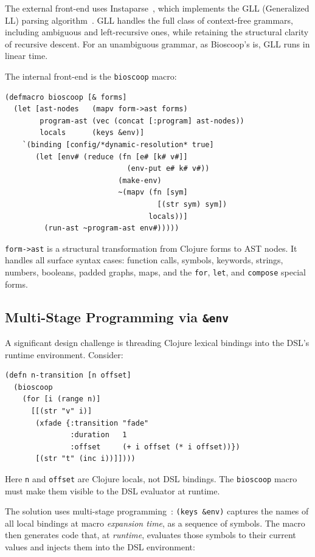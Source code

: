 \documentclass[conference]{IEEEtran}
\begin{document}
The external front-end uses Instaparse~\cite{instaparse}, which implements the GLL (Generalized LL) parsing algorithm~\cite{gll}. GLL handles the full class of context-free grammars, including ambiguous and left-recursive ones, while retaining the structural clarity of recursive descent. For an unambiguous grammar, as Bioscoop's is, GLL runs in linear time.

The internal front-end is the \texttt{bioscoop} macro:

\begin{lstlisting}[caption={The bioscoop macro}]
(defmacro bioscoop [& forms]
  (let [ast-nodes   (mapv form->ast forms)
        program-ast (vec (concat [:program] ast-nodes))
        locals      (keys &env)]
    `(binding [config/*dynamic-resolution* true]
       (let [env# (reduce (fn [e# [k# v#]]
                            (env-put e# k# v#))
                          (make-env)
                          ~(mapv (fn [sym]
                                   [(str sym) sym])
                                 locals))]
         (run-ast ~program-ast env#)))))
\end{lstlisting}

\texttt{form->ast} is a structural transformation from Clojure forms to AST nodes. It handles all surface syntax cases: function calls, symbols, keywords, strings, numbers, booleans, padded graphs, maps, and the \texttt{for}, \texttt{let}, and \texttt{compose} special forms.

\subsection{Multi-Stage Programming via \texttt{\&env}}

A significant design challenge is threading Clojure lexical bindings into the DSL's runtime environment. Consider:

\begin{lstlisting}[caption={Parameterized iteration with lexical scope}]
(defn n-transition [n offset]
  (bioscoop
    (for [i (range n)]
      [[(str "v" i)]
       (xfade {:transition "fade"
               :duration   1
               :offset     (+ i offset (* i offset))})
       [(str "t" (inc i))]])))
\end{lstlisting}

Here \texttt{n} and \texttt{offset} are Clojure locals, not DSL bindings. The \texttt{bioscoop} macro must make them visible to the DSL evaluator at runtime.

The solution uses multi-stage programming~\cite{taha}: \texttt{(keys \&env)} captures the names of all local bindings at macro \emph{expansion time}, as a sequence of symbols. The macro then generates code that, at \emph{runtime}, evaluates those symbols to their current values and injects them into the DSL environment:
\end{document}
